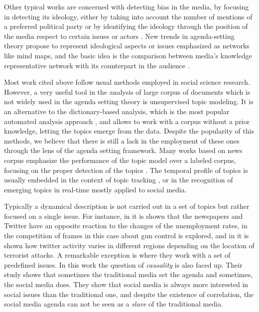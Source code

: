 \par Other typical works are concerned with detecting bias in the media, by focusing in detecting its ideology, either by taking into account the number of mentions of a preferred political party \cite{lazaridou2016identifying}\cite{baumgartner2015all} or by identifying the ideology through the position of the media respect to certain issues or actors \cite{elejalde2018nature}\cite{sagarzazu2017hugo}.
New trends in agenda-setting theory propose to represent ideological aspects or issues emphasized as networks like mind maps, and the basic idea is the comparison between media's knowledge representative network with its counterpart in the audience \cite{guo2012application}\cite{vu2014exploring}.

\par Most work cited above follow usual methods employed in social science research.
However, a very useful tool in the analysis of large corpus of documents which is not widely used in the agenda setting theory is unsupervised topic modeling.
It is an alternative to the dictionary-based analysis, which is the most popular automated analysis approach \cite{guo2016big}, and allows to work with a corpus without a prior knowledge, letting the topics emerge from the data. Despite the popularity of this methods, we believe that there is still a lack in the employment of these ones through the lens of the agenda setting framework.
Many works based on news corpus emphasize the performance of the topic model over a labeled corpus, focusing on the proper detection of the topics \cite{dai2010online}\cite{po2016topic}\cite{brun2000experiment}.
The temporal profile of topics is usually embedded in the context of topic tracking \cite{hu2016news}\cite{li2017joint}, or in the recognition of emerging topics in real-time \cite{cataldi2010emerging} mostly applied to social media.
\par Typically a dynamical description is not carried out in a set of topics but rather focused on a single issue.
For instance, in \cite{soroka2017negativity} it is shown that the newspapers and Twitter have an opposite reaction to the changes of the unemployment rates, in \cite{guggenheim2015dynamics} the competition of frames in this case about gun control is explored,
and in \cite{ali2018measuring} it is shown how twitter activity varies in different regions depending on the location of terrorist attacks.
A remarkable exception is \cite{russell2014dynamics} where they work with a set of predefined issues. In this work the question of \emph{causality} is also faced up. Their study shows that sometimes the traditional media set the agenda and sometimes, the social media does. They show that social media is always more interested in social issues than the traditional one, and despite the existence of correlation, the social media agenda can not be seen as a \emph{slave} of the traditional media.

